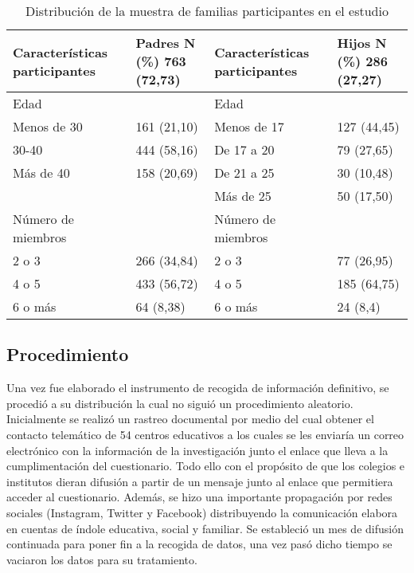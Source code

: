 \documentclass[spanish]{textolivre}
\begin{document}
\begin{table}[htpb]
\caption{Distribución de la muestra de familias participantes en el estudio}
\label{tab1}
\centering
\begin{tabular}{p{}p{}p{}p{}}
\toprule 
Características participantes & Padres N (\%) 763 (72,73)	& Características participantes	& Hijos N (\%) 286 (27,27)
\\
\midrule
Edad & & Edad &
\\ 
\midrule
Menos de 30	& 161 (21,10) & Menos de 17 & 127 (44,45)
\\
30-40 & 444 (58,16) & De 17 a 20 & 79 (27,65)
\\
Más de 40 & 158 (20,69) & De 21 a 25 & 30 (10,48)
\\
& & Más de 25 & 50 (17,50)
\\
\midrule
Número de miembros & & Número de miembros &
\\
\midrule
2 o 3 & 266 (34,84)	& 2 o 3 & 77 (26,95)
\\
4 o 5 & 433 (56,72)	& 4 o 5 & 185 (64,75)
\\
6 o más	& 64 (8,38)	& 6 o más & 24 (8,4)
\\
\bottomrule
\end{tabular}
\centering
{}
\end{table}

\subsection{Procedimiento}
Una vez fue elaborado el instrumento de recogida de información definitivo, se procedió a su distribución la cual no siguió un procedimiento aleatorio. Inicialmente se realizó un rastreo documental por medio del cual obtener el contacto telemático de 54 centros educativos a los cuales se les enviaría un correo electrónico con la información de la investigación junto el enlace que lleva a la cumplimentación del cuestionario. Todo ello con el propósito de que los colegios e institutos dieran difusión a partir de un mensaje junto al enlace que permitiera acceder al cuestionario. Además, se hizo una importante propagación por redes sociales (Instagram, Twitter y Facebook) distribuyendo la comunicación elabora en cuentas de índole educativa, social y familiar. Se estableció un mes de difusión continuada para poner fin a la recogida de datos, una vez pasó dicho tiempo se vaciaron los datos para su tratamiento.  
\end{document}
